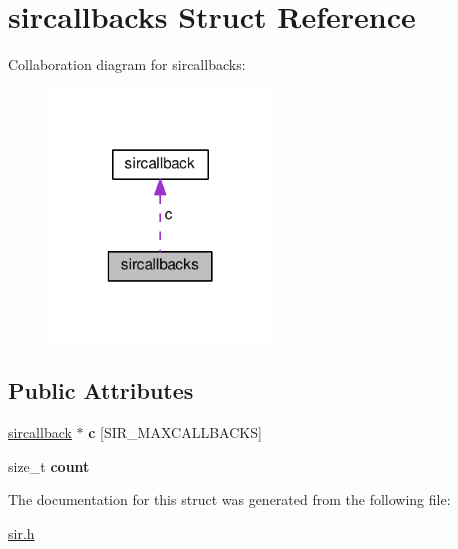 \hypertarget{structsircallbacks}{}\section{sircallbacks Struct Reference}
\label{structsircallbacks}


Collaboration diagram for sircallbacks\+:\nopagebreak
\begin{figure}[H]
\begin{center}
\leavevmode
\includegraphics[width=169pt]{structsircallbacks__coll__graph}
\end{center}
\end{figure}
\subsection*{Public Attributes}
\begin{DoxyCompactItemize}
\item 
\hyperlink{structsircallback}{sircallback} $\ast$ {\bfseries c} \mbox{[}S\+I\+R\+\_\+\+M\+A\+X\+C\+A\+L\+L\+B\+A\+C\+KS\mbox{]}\hypertarget{structsircallbacks_ac2e6a57c1eb916c941f6ce235d0e6628}{}\label{structsircallbacks_ac2e6a57c1eb916c941f6ce235d0e6628}

\item 
size\+\_\+t {\bfseries count}\hypertarget{structsircallbacks_ac5cf94ffe3dfa9ac0e4fb7b2b8d97cf1}{}\label{structsircallbacks_ac5cf94ffe3dfa9ac0e4fb7b2b8d97cf1}

\end{DoxyCompactItemize}


The documentation for this struct was generated from the following file\+:\begin{DoxyCompactItemize}
\item 
\hyperlink{sir_8h}{sir.\+h}\end{DoxyCompactItemize}
